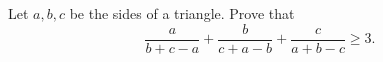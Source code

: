 Let $a, b, c$ be the sides of a triangle. Prove that
\[ \frac{a}{b + c - a} + \frac{b}{c + a - b} + \frac{c}{a + b - c} \geq 3. \]
